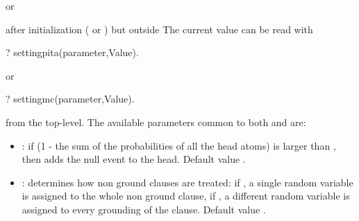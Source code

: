 \documentclass[letterpaper,10pt,english]{sphinxmanual}
\begin{document}
or

\begin{sphinxVerbatim}[commandchars=\\\{\}]
 
\end{sphinxVerbatim}

after initialization ( or ) but outside 
The current value can be read with

\begin{sphinxVerbatim}[commandchars=\\\{\}]
?\PYGZhy{} setting\PYGZus{}pita(\PYGZlt{}parameter\PYGZgt{},Value).
\end{sphinxVerbatim}

or

\begin{sphinxVerbatim}[commandchars=\\\{\}]
?\PYGZhy{} setting\PYGZus{}mc(\PYGZlt{}parameter\PYGZgt{},Value).
\end{sphinxVerbatim}

from the top-level.
The available parameters common to both  and  are:
\begin{itemize}
\item {} 
: if (1 - the sum of the probabilities of all the head atoms) is larger than , then  adds the null event to the head. Default value .

\item {} 
: determines how non ground clauses are treated: if , a single random variable is assigned to the whole non ground clause, if , a different random variable is assigned to every grounding of the clause. Default value .

\end{itemize}
\end{document}

